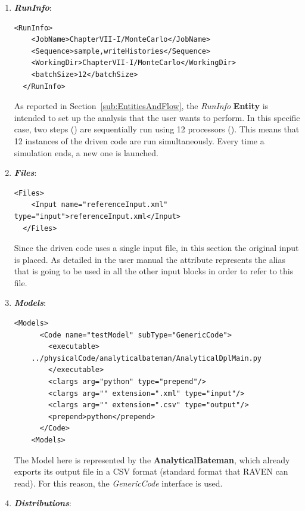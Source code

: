 \begin{enumerate}
   \item \textbf{\textit{RunInfo}}:
\begin{lstlisting}[style=XML,morekeywords={arg,extension,pauseAtEnd,overwrite}]
  <RunInfo>
    <JobName>ChapterVII-I/MonteCarlo</JobName>
    <Sequence>sample,writeHistories</Sequence>
    <WorkingDir>ChapterVII-I/MonteCarlo</WorkingDir>
    <batchSize>12</batchSize>
  </RunInfo>
\end{lstlisting}   
   As reported in Section~\ref{sub:EntitiesAndFlow}, the \textit{RunInfo} \textbf{Entity} is intended to set up the analysis 
   that the user wants to perform. In this specific case, two steps () are sequentially run 
   using 12 processors (). This means that
   12 instances of the driven code are run simultaneously. 
   Every time a simulation ends, a new one is launched.
   \item \textbf{\textit{Files}}:
\begin{lstlisting}[style=XML,morekeywords={arg,extension,pauseAtEnd,overwrite}]
  <Files>
    <Input name="referenceInput.xml" type="input">referenceInput.xml</Input>
  </Files>
\end{lstlisting}
   Since the driven code uses a single input file, in this section the original input is placed. As detailed in the user manual
   the attribute   represents the alias that is going to be used in all the other input blocks in order to refer to this file.
   \item \textbf{\textit{Models}}:
\begin{lstlisting}[style=XML,morekeywords={arg,extension,pauseAtEnd,overwrite}]
   <Models>
      <Code name="testModel" subType="GenericCode">
        <executable>
    ../physicalCode/analyticalbateman/AnalyticalDplMain.py
        </executable>
        <clargs arg="python" type="prepend"/>
        <clargs arg="" extension=".xml" type="input"/>
        <clargs arg="" extension=".csv" type="output"/>
        <prepend>python</prepend>
      </Code>
    <Models>
\end{lstlisting}
 The Model here is represented by the 
 \textbf{AnalyticalBateman}, which already exports its output file in a 
 CSV format (standard format that RAVEN can read). For this reason,
 the \textit{GenericCode} interface is used.
   \item \textbf{\textit{Distributions}}:
\begin{lstlisting}[style=XML,morekeywords={arg,extension,pauseAtEnd,overwrite}]

\end{lstlisting}
\end{enumerate}

